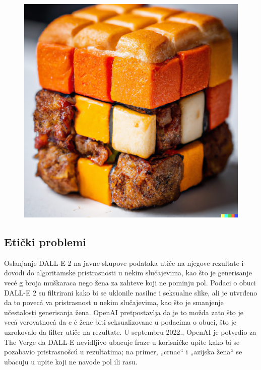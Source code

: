 \documentclass[a4paper]{article}
\begin{document}
\begin{figure}[h!]
\begin{center}
\includegraphics[scale=0.75]{hamburger.jpg}
\end{center}
\label{fig:hamburger}
\end{figure}
\newpage
\subsection{Etički problemi}
\label{subsec: Etički problemi}
Oslanjanje DALL-E 2 na javne skupove podataka utiče na njegove rezultate i dovodi do algoritamske pristrasnosti u nekim slučajevima, kao što je generisanje vecé g broja muškaraca nego žena za zahteve koji ne pominju pol. Podaci o obuci DALL-E 2 su filtrirani kako bi se uklonile nasilne i seksualne slike, ali je utvrđeno da to povecá va pristrasnost u nekim slučajevima, kao što je smanjenje učestalosti generisanja žena. OpenAI pretpostavlja da je to možda zato što je vecá verovatnocá da c é žene biti seksualizovane u podacima o obuci, što je uzrokovalo da filter utiče na rezultate. U septembru 2022., OpenAI je potvrdio za The Verge da DALL-E nevidljivo ubacuje fraze u korisničke upite kako bi se pozabavio pristrasnošcú u rezultatima; na primer, „crnac“ i „azijska žena“ se ubacuju u upite koji ne navode pol ili rasu.
\end{document}
